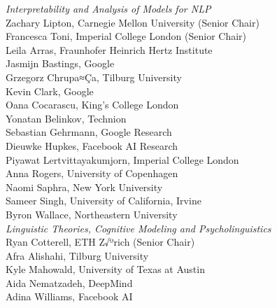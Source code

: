 \emph{Interpretability and Analysis of Models for NLP} \\
\hspace*{0.2in} Zachary Lipton, Carnegie Mellon University (Senior Chair)\\
\hspace*{0.2in} Francesca Toni, Imperial College London (Senior Chair)\\
\hspace*{0.2in} Leila Arras, Fraunhofer Heinrich Hertz Institute\\
\hspace*{0.2in} Jasmijn Bastings, Google\\
\hspace*{0.2in} Grzegorz Chrupa≈Ça, Tilburg University\\
\hspace*{0.2in} Kevin Clark, Google\\
\hspace*{0.2in} Oana Cocarascu, King's College London\\
\hspace*{0.2in} Yonatan Belinkov, Technion\\
\hspace*{0.2in} Sebastian Gehrmann, Google Research\\
\hspace*{0.2in} Dieuwke Hupkes, Facebook AI Research\\
\hspace*{0.2in} Piyawat Lertvittayakumjorn, Imperial College London\\
\hspace*{0.2in} Anna Rogers, University of Copenhagen\\
\hspace*{0.2in} Naomi Saphra, New York University\\
\hspace*{0.2in} Sameer Singh, University of California, Irvine\\
\hspace*{0.2in} Byron Wallace, Northeastern University\\

\emph{Linguistic Theories, Cognitive Modeling and Psycholinguistics} \\
\hspace*{0.2in} Ryan Cotterell, ETH Z√ºrich (Senior Chair)\\
\hspace*{0.2in} Afra Alishahi, Tilburg University\\
\hspace*{0.2in} Kyle Mahowald, University of Texas at Austin\\
\hspace*{0.2in} Aida Nematzadeh, DeepMind\\
\hspace*{0.2in} Adina Williams, Facebook AI\\

